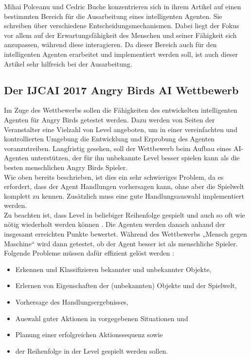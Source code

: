 Mihai Polceanu und Cedric Buche konzentrieren sich in ihrem Artikel auf einen bestimmten Bereich für die Ausarbeitung eines intelligenten Agenten. Sie schreiben über verschiedene Entscheidungsmechanismen. Dabei liegt der Fokus vor allem auf der Erwartungsfähigkeit des Menschen und seiner Fähigkeit sich anzupassen, während diese interagieren. Da dieser Bereich auch für den intelligenten Agenten erarbeitet und implementiert werden soll, ist auch dieser Artikel sehr hilfreich bei der Ausarbeitung. \cite{dudeliberately}

\subsection{Der IJCAI 2017 Angry Birds AI Wettbewerb}
Im Zuge des Wettbewerbs sollen die Fähigkeiten des entwickelten intelligenten Agenten für Angry Birds getestet werden. Dazu werden von Seiten der Veranstalter eine Vielzahl von Level angeboten, um in einer vereinfachten und kontrollierten Umgebung die Entwicklung und Erprobung des Agenten voranzutreiben. Langfristig gesehen, soll der Wettbewerb beim Aufbau eines AI-Agenten unterstützen, der für ihn unbekannte Level besser spielen kann als die besten menschlichen Angry Birds Spieler. \cite{renz2015angry} \\
Wie oben bereits beschrieben, ist dies ein sehr schwieriges Problem, da es erfordert, dass der Agent Handlungen vorhersagen kann, ohne aber die Spielwelt komplett zu kennen. Zusätzlich muss eine gute Handlungsauswahl implementiert werden.\\
Zu beachten ist, dass Level in beliebiger Reihenfolge gespielt und auch so oft wie nötig wiederholt werden können \cite{renz2015aibirds}. Die Agenten werden danach anhand der insgesamt erreichten Punkte bewertet. Während des Wettbewerbs „Mensch gegen Maschine“ wird dann getestet, ob der Agent besser ist als menschliche Spieler. Folgende Probleme müssen dafür effizient gelöst werden \cite{dudeliberately}:

\begin{itemize}
\item Erkennen und Klassifizieren bekannter und unbekannter Objekte,
\item Erlernen von Eigenschaften der (unbekannten) Objekte und der Spielwelt,
\item Vorhersage des Handlungsergebnisses,
\item Auswahl guter Aktionen in vorgegebenen Situationen und
\item Planung einer erfolgreichen Aktionssequenz sowie
\item  der Reihenfolge in der Level gespielt werden sollen.
\end{itemize}

